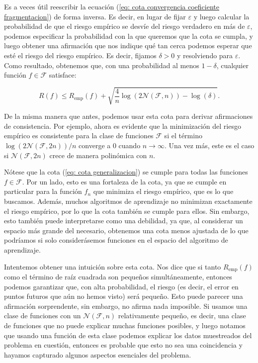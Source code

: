 \documentclass{report}
\begin{document}
Es a veces útil reescribir la ecuación (\ref{eq: cota convergencia coeficiente fragmentacion}) de forma inversa. Es decir, en lugar de 
fijar \(\varepsilon\) y 
luego calcular la probabilidad de que el riesgo empírico se desvíe del riesgo verdadero en más de \(\varepsilon\), 
podemos especificar la probabilidad con la que queremos que la cota se cumpla, y luego obtener una afirmación 
que nos indique qué tan cerca podemos esperar que esté el riesgo del riesgo empírico. Es decir, fijamos \(\delta > 0\) 
y resolviendo para \(\varepsilon\). Como resultado, obtenemos que, con una probabilidad al menos \(1 - \delta\), cualquier 
función \(f \in \mathcal{F}\) satisface:

\begin{equation}
    R(f) \leq R_{\text{emp}}(f) + \sqrt{\frac{4}{n} \log(2\mathcal{N}(\mathcal{F}, n)) - \log(\delta)}. \label{eq: cota generalizacion}
\end{equation}
\newline

De la misma manera que antes, podemos usar esta cota para derivar afirmaciones de consistencia. Por ejemplo, 
ahora es evidente que la minimización del riesgo empírico es consistente para la clase de funciones \(\mathcal{F}\) 
si el término \(\log(2\mathcal{N}(\mathcal{F}, 2n))/n\) converge a \(0\) cuando \(n \to \infty\). Una vez más, 
este es el caso si \(\mathcal{N}(\mathcal{F}, 2n)\) crece de manera polinómica con \(n\).\newline

Nótese que la cota (\ref{eq: cota generalizacion}) se cumple para todas las funciones \(f \in \mathcal{F}\). 
Por un lado, esto es una fortaleza 
de la cota, ya que se cumple en particular para la función \(f_n\) que minimiza el riesgo empírico, que es lo que 
buscamos. Además, muchos algoritmos de aprendizaje no minimizan exactamente el riesgo empírico, por lo que la cota 
también se cumple para ellos. Sin embargo, esto también puede interpretarse como una debilidad, ya que, al considerar 
un espacio más grande del necesario, obtenemos una cota menos ajustada de lo que podríamos si solo considerásemos
funciones en el espacio del algoritmo de aprendizaje.\newline

Intentemos obtener una intuición sobre esta cota. Nos dice que si tanto \(R_{\text{emp}}(f)\) como el término 
de raíz cuadrada son pequeños simultáneamente, entonces podemos garantizar que, con alta probabilidad, el 
riesgo (es decir, el error en puntos futuros que aún no hemos visto) será pequeño. Esto puede parecer una 
afirmación sorprendente, sin embargo, no afirma nada imposible. Si usamos una clase de funciones con un 
\(\mathcal{N}(\mathcal{F}, n)\) relativamente pequeño, es decir, una clase de funciones que no puede explicar 
muchas funciones posibles, y luego notamos que usando una función de esta clase podemos explicar los datos muestreados 
del problema en cuestión, entonces es probable que esto no sea una coincidencia y hayamos capturado algunos aspectos 
esenciales del problema. \newline
\end{document}
